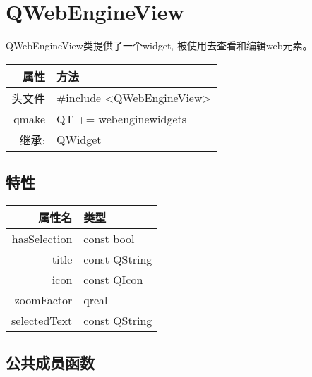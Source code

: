 \chapter{QWebEngineView}

QWebEngineView类提供了一个widget, 被使用去查看和编辑web元素。

\begin{tabular}{|r|l|}
	\hline
	属性 & 方法 \\
	\hline
	头文件 & \#include <QWebEngineView>\\      
	\hline
	qmake & QT += webenginewidgets\\      
	\hline
	继承: & QWidget\\
	\hline
\end{tabular}

\section{特性}

\begin{tabular}{|r|l|}
	\hline
	属性名 & 类型 \\
	\hline
	hasSelection&	const bool \\
	\hline
	title	&const QString\\
	\hline
	icon	&const QIcon\\
	\hline
	zoomFactor&	qreal\\
	\hline
	selectedText&	const QString\\
	\hline
\end{tabular}

\section{公共成员函数}

